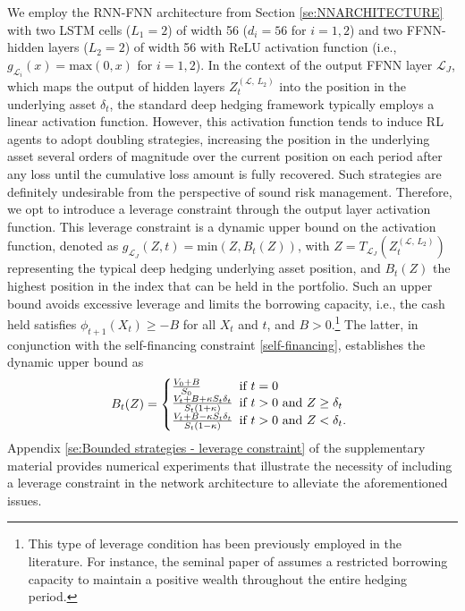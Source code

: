 \documentclass[12pt]{article}
\begin{document}
We employ the RNN-FNN architecture from Section \ref{se:NNARCHITECTURE} with two LSTM cells ($L_{1}=2$) of width 56  ($d_{i}=56$ for $i=1,2$) and two FFNN-hidden layers ($L_{2}=2$) of width 56 with ReLU activation function (i.e., $g_{\mathcal{L}_{i}}(x)=\mbox{max}(0,x)$ for $i=1,2$). In the context of the output FFNN layer $\mathcal{L}_{J}$, which maps the output of hidden layers $Z^{(\mathcal{L},\, L_{2})}_{t}$ into the position in the underlying asset $\delta_{t}$, the standard deep hedging framework typically employs a linear activation function. However, this activation function tends to induce RL agents to adopt doubling strategies, increasing the position in the underlying asset several orders of magnitude over the current position on each period after any loss until the cumulative loss amount is fully recovered. Such strategies are definitely undesirable from the perspective of sound risk management. Therefore, we opt to introduce a leverage constraint through the output layer activation function.
This leverage constraint is a dynamic upper bound on the activation function, denoted as $g_{\mathcal{L}_{J}}(Z,t)=\mbox{min}(Z,B_{t}(Z))$, with $Z=T_{\mathcal{L}_{J}}(Z^{(\mathcal{L},\, L_{2})}_{t})$ representing the typical deep hedging underlying asset position, and $B_{t}(Z)$ the highest position in the index
that can be held in the portfolio. 
Such an upper bound avoids excessive leverage and limits the borrowing capacity, i.e., the cash held satisfies $\phi_{t+1}(X_{t})\geq -B$ for all $X_{t}$ and $t$, and $B>0$.\footnote{This type of leverage condition has been previously employed in the literature. For instance, the seminal paper of \mbox{\cite{harrison1981martingales}} assumes a restricted borrowing capacity to maintain a positive wealth throughout the entire hedging period.} The latter, in conjunction with the self-financing constraint \eqref{self-financing}, establishes the dynamic upper bound as
\begin{equation}\label{boundary_condition}
    B_{t}(Z) = \left\{
     \begin{array}{@{}l@{\thinspace}l}
       \frac{V_{0}+B}{S_{0}}  & \text{ if } t=0\\
       \frac{V_{t}+B+\kappa S_{t}\delta_{t}}{S_{t}(1+\kappa)} & \text{ if } t>0 \text{ and } Z\geq \delta_{t} \\
       \frac{V_{t}+B-\kappa S_{t}\delta_{t}}{S_{t}(1-\kappa)} & \text{ if } t>0 \text{ and } Z< \delta_{t}. \\
     \end{array}
   \right.
\end{equation}
Appendix \ref{se:Bounded strategies - leverage constraint} of the supplementary material provides numerical experiments that illustrate the necessity of including a leverage constraint in the network architecture to alleviate the aforementioned issues.
\end{document}
